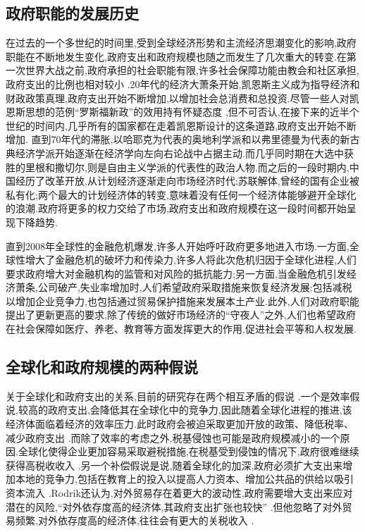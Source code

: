 \documentclass[10pt]{article}
\begin{document}
\subsection{政府职能的发展历史}
在过去的一个多世纪的时间里,受到全球经济形势和主流经济思潮变化的影响,政府职能在不断地发生变化,政府支出和政府规模也随之而发生了几次重大的转变.在第一次世界大战之前,政府承担的社会职能有限,许多社会保障功能由教会和社区承担,政府支出的比例也相对较小 \cite{Beito2002The} .20年代的经济大萧条开始,凯恩斯主义成为指导经济和财政政策真理,政府支出开始不断增加,以增加社会总消费和总投资.尽管一些人对凯恩斯思想的范例“罗斯福新政”的效用持有怀疑态度 \cite{rothbard1972america},但不可否认,在接下来的近半个世纪的时间内,几乎所有的国家都在走着凯恩斯设计的这条道路,政府支出开始不断增加.
直到70年代的滞胀,以哈耶克为代表的奥地利学派和以弗里德曼为代表的新古典经济学派开始逐渐在经济学向左向右论战中占据主动.而几乎同时期在大选中获胜的里根和撒切尔,则是自由主义学派的代表性的政治人物.而之后的一段时期内,中国经历了改革开放,从计划经济逐渐走向市场经济时代;苏联解体,曾经的国有企业被私有化;两个最大的计划经济体的转变,意味着没有任何一个经济体能够避开全球化的浪潮.政府将更多的权力交给了市场,政府支出和政府规模在这一段时间都开始呈现下降趋势.


直到2008年全球性的金融危机爆发,许多人开始呼吁政府更多地进入市场.一方面,全球性增大了金融危机的破坏力和传染力,许多人将此次危机归因于全球化进程,人们要求政府增大对金融机构的监管和对风险的抵抗能力;另一方面,当金融危机引发经济萧条,公司破产,失业率增加时,人们希望政府采取措施来恢复经济发展:包括减税以增加企业竞争力,也包括通过贸易保护措施来发展本土产业.此外,人们对政府职能提出了更新更高的要求,除了传统的做好市场经济的“守夜人”之外,人们也希望政府在社会保障如医疗、养老、教育等方面发挥更大的作用,促进社会平等和人权发展.
\subsection{全球化和政府规模的两种假说}
关于全球化和政府支出的关系,目前的研究存在两个相互矛盾的假说 \cite{garrett2001globalization} .一个是效率假说,较高的政府支出,会降低其在全球化中的竞争力,因此随着全球化进程的推进,该经济体面临着经济的效率压力.此时政府会被迫采取更加开放的政策、降低税率、减少政府支出 \cite{wangyu2014} .而除了效率的考虑之外,税基侵蚀也可能是政府规模减小的一个原因.全球化使得企业更加容易采取避税措施,在税基受到侵蚀的情况下,政府很难继续获得高税收收入 \cite{tanzi2000globalization} .另一个补偿假说是说,随着全球化的加深,政府必须扩大支出来增加本地的竞争力,包括在教育上的投入以提高人力资本、增加公共品的供给以吸引资本流入 \cite{rodrik1998more} .Rodrik还认为,对外贸易存在着更大的波动性,政府需要增大支出来应对潜在的风险,“对外依存度高的经济体,其政府支出扩张也较快”  \cite{rodrik1998more} .但他忽略了对外贸易频繁,对外依存度高的经济体,往往会有更大的关税收入 \cite{tanzi1973theory}.
\end{document}
